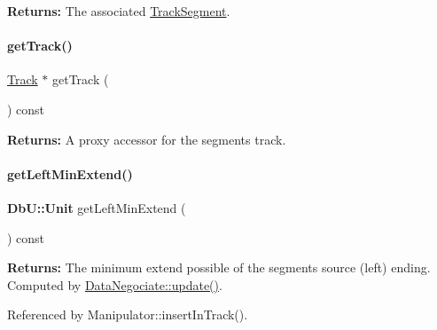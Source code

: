 {\bfseries Returns\+:} The associated \mbox{\hyperlink{classKite_1_1TrackSegment}{Track\+Segment}}. \mbox{\label{classKite_1_1DataNegociate_a3f34f9139b8491a0adb531ac3a904171}} 
\paragraph{\texorpdfstring{get\+Track()}{getTrack()}}
{\footnotesize\ttfamily \mbox{\hyperlink{classKite_1_1Track}{Track}} $\ast$ get\+Track (\begin{DoxyParamCaption}{ }\end{DoxyParamCaption}) const\hspace{0.3cm}{\ttfamily [inline]}}

{\bfseries Returns\+:} A proxy accessor for the segment\textquotesingle{}s track. \mbox{\label{classKite_1_1DataNegociate_a56149c72d0bfe5e33795782b646061b1}} 
\paragraph{\texorpdfstring{get\+Left\+Min\+Extend()}{getLeftMinExtend()}}
{\footnotesize\ttfamily \textbf{ Db\+U\+::\+Unit} get\+Left\+Min\+Extend (\begin{DoxyParamCaption}{ }\end{DoxyParamCaption}) const\hspace{0.3cm}{\ttfamily [inline]}}

{\bfseries Returns\+:} The minimum extend possible of the segment\textquotesingle{}s source (left) ending. Computed by \mbox{\hyperlink{classKite_1_1DataNegociate_ac5c54df7ed3b930268c8d7752c101725}{Data\+Negociate\+::update()}}. 

Referenced by Manipulator\+::insert\+In\+Track().

\mbox{\label{classKite_1_1DataNegociate_abf06c826acae81494b01b904d3277cc1}} 
